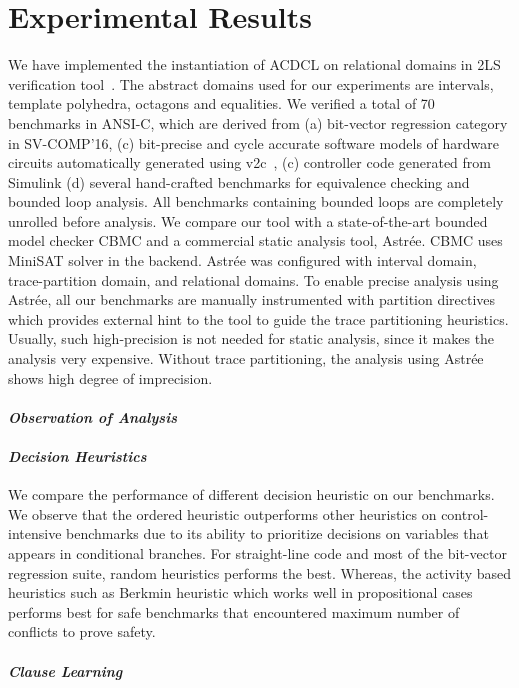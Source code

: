 \section{Experimental Results}
We have implemented the instantiation of ACDCL on relational domains 
in 2LS verification tool~\cite{2ls}.  The abstract domains used for 
our experiments are intervals, template polyhedra, octagons and equalities.  
We verified a total of 70 benchmarks in ANSI-C, which are derived from 
(a) bit-vector regression category in SV-COMP'16, (c) bit-precise and 
cycle accurate software models of hardware circuits automatically 
generated using v2c~\cite{mtk2016}, (c) controller code generated 
from Simulink (d) several hand-crafted benchmarks for equivalence 
checking and bounded loop analysis.  All benchmarks containing 
bounded loops are completely unrolled before analysis.  We compare 
our tool with a state-of-the-art bounded model checker CBMC and a 
commercial static analysis tool, Astr{\'e}e.  CBMC uses MiniSAT 
solver in the backend.  Astr{\'e}e was configured with interval 
domain, trace-partition domain, and relational domains.  To enable precise 
analysis using Astr{\'e}e, all our benchmarks are manually instrumented with 
partition directives which provides external hint to the tool to guide 
the trace partitioning heuristics.  Usually, such high-precision is not 
needed for static analysis, since it makes the analysis very expensive.  
Without trace partitioning, the analysis using Astr{\'e}e shows high 
degree of imprecision. 

\paragraph {\em Observation of Analysis}

\paragraph {\em Decision Heuristics} We compare the performance of 
different decision heuristic on our benchmarks.  We observe that 
the ordered heuristic outperforms other heuristics on control-intensive 
benchmarks due to its ability to prioritize decisions on variables that 
appears in conditional branches.  For straight-line code and most of 
the bit-vector regression suite, random heuristics performs the best.  
Whereas, the activity based heuristics such as Berkmin heuristic which 
works well in propositional cases performs best for safe benchmarks 
that encountered maximum number of conflicts to prove safety.

\paragraph {\em Clause Learning}      

  

